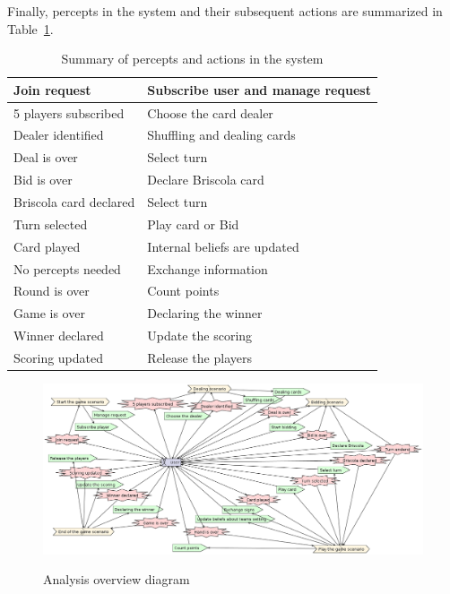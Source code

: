 \documentclass[a4paper]{article}
\begin{document}
Finally, percepts in the system and their subsequent actions are summarized in Table~\ref{table:inout}.

\begin{table}[htp]
  \begin{tabular}{|l|l|}
    \hline
    Join request	& Subscribe user and manage request  \\
    \hline
    5 players subscribed	& Choose the card dealer \\
    \hline
    Dealer identified	& Shuffling and dealing cards  \\
    \hline
    Deal is over	& Select turn \\
    \hline
    Bid is over	& Declare Briscola card \\ 
    \hline
    Briscola card declared	& Select turn  \\
    \hline
    Turn selected	& Play card or Bid \\
    \hline
    Card played	& Internal beliefs are updated\\
    \hline
    No percepts needed & Exchange information \\
    \hline
    Round is over	& Count points \\
    \hline
    Game is over	& Declaring the winner \\
    \hline
    Winner declared	 & Update the scoring \\
    \hline
    Scoring updated	& Release the players \\
    \hline
  \end{tabular}
  \label{table:inout}
  \caption{Summary of percepts and actions in the system}
\end{table}


\begin{figure}[htp]
  \centering
  \includegraphics[keepaspectratio,scale=0.35]{pdt/images/system_specification/analysis_overview.png}
  \label{fig:analysis}
  \caption{Analysis overview diagram}
\end{figure}
\end{document}
